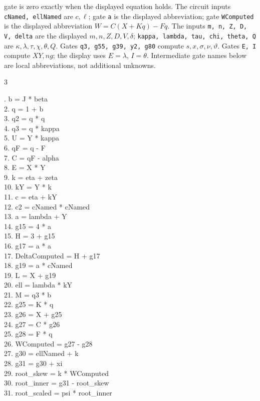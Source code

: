 \documentclass[10pt]{article}
\begin{document}
gate is zero exactly when the displayed equation holds. The circuit inputs
\texttt{cNamed, ellNamed} are $c,\ell$; gate \texttt{a} is the displayed abbreviation; gate \texttt{WComputed} is the displayed abbreviation $W=C(X+Kq)-Fq$. The inputs
\texttt{m, n, Z, D, V, delta} are the displayed
$m,n,Z,D,V,\delta$; \texttt{kappa, lambda, tau, chi, theta, Q}
are $\kappa,\lambda,\tau,\chi,\theta,Q$. Gates \texttt{q3, g55, g39, y2, g80} compute $s,x,\sigma,\nu,\vartheta$. Gates \texttt{E, I} compute
$XY,ng$; the display uses $E=\lambda$, $I=\theta$. Intermediate gate
names below are local abbreviations, not additional unknowns.
\begin{multicols}{3}
\raggedright\ttfamily\fontsize{7.2}{8.4}. b = J * beta\\
2. q = 1 + b\\
3. q2 = q * q\\
4. q3 = q * kappa\\
5. U = Y * kappa\\
6. qF = q - F\\
7. C = qF - alpha\\
8. E = X * Y\\
9. k = eta + zeta\\
10. kY = Y * k\\
11. c = eta + kY\\
12. c2 = cNamed * cNamed\\
13. a = lambda + Y\\
14. g15 = 4 * a\\
15. H = 3 + g15\\
16. g17 = a * a\\
17. DeltaComputed = H + g17\\
18. g19 = a * cNamed\\
19. L = X + g19\\
20. ell = lambda * kY\\
21. M = q3 * b\\
22. g25 = K * q\\
23. g26 = X + g25\\
24. g27 = C * g26\\
25. g28 = F * q\\
26. WComputed = g27 - g28\\
27. g30 = ellNamed + k\\
28. g31 = g30 + xi\\
29. root\_skew = k * WComputed\\
30. root\_inner = g31 - root\_skew\\
31. root\_scaled = psi * root\_inner\\

\end{multicols}
\end{document}
